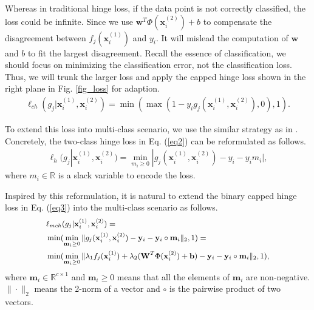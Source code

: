 \documentclass[10pt,journal,compsoc]{IEEEtran}
\begin{document}
Whereas in traditional hinge loss, if the data point is not correctly classified, the loss could be infinite. Since we use $\mathbf{w}^T \Phi(\mathbf{x}_i^{(2)})+b$ to compensate the disagreement between $f_j(\mathbf{x}_i^{(1)})$ and $y_i$. It will mislead the computation of $\mathbf{w}$ and $b$ to fit the largest disagreement. Recall the essence of classification, we should focus on minimizing the classification error, not the classification loss. Thus, we will trunk the larger loss and apply the capped hinge loss shown in the right plane in Fig. \ref{fig_loss} for adaption.
\begin{equation}
\label{eq3}
\begin{split}
 \ell_{ch}(g_j|\mathbf{x}_i^{(1)},\mathbf{x}_i^{(2)})
= \min( \max(1-y_i g_j(\mathbf{x}_i^{(1)},\mathbf{x}_i^{(2)}), 0),1).
\end{split}
\end{equation}

To extend this loss into multi-class scenario, we use the similar strategy as in \cite{XiangNMPZ12, NieWH17}. Concretely, the two-class hinge loss in Eq. (\ref{eq2}) can be reformulated as follows.
\begin{equation}
\label{eq4}
\begin{split}
 \ell_{h}(g_j|\mathbf{x}_i^{(1)},\mathbf{x}_i^{(2)}) =\min_{m_i\geq 0} | g_j(\mathbf{x}_i^{(1)},\mathbf{x}_i^{(2)}) - y_i-y_i m_i|,
\end{split}
\end{equation}
where $m_i \in \mathbb{R}$ is a slack variable to encode the loss.

Inspired by this reformulation, it is natural to extend the binary capped hinge loss in Eq. (\ref{eq3}) into the multi-class scenario as follows.
\begin{equation}
\label{eq5}
\small{
\begin{split}
 & \ell_{mch}(g_j|\mathbf{x}_i^{(1)},\mathbf{x}_i^{(2)})=\\
& \min(\min_{\mathbf{m}_i\geq 0} \| g_j(\mathbf{x}_i^{(1)},\mathbf{x}_i^{(2)}) - \mathbf{y}_i-\mathbf{y}_i\circ \mathbf{m}_i\|_2,1)= \\
& \min(\min_{\mathbf{m}_i\geq 0} \| \lambda_1 f_j(\mathbf{x}_i^{(1)})+\lambda_2 (\mathbf{W}^T \Phi(\mathbf{x}_i^{(2)})+\mathbf{b}) - \mathbf{y}_i-\mathbf{y}_i \circ \mathbf{m}_i\|_2,1),
\end{split}}
\end{equation}
where $\mathbf{m}_i\in \mathbb{R}^{c\times1}$ and $\mathbf{m}_i\geq 0$ means that all the elements of $\mathbf{m}_i$ are non-negative. $\|\cdot\|_2$ means the 2-norm of a vector and $\circ$ is the pairwise product of two vectors.
\end{document}
